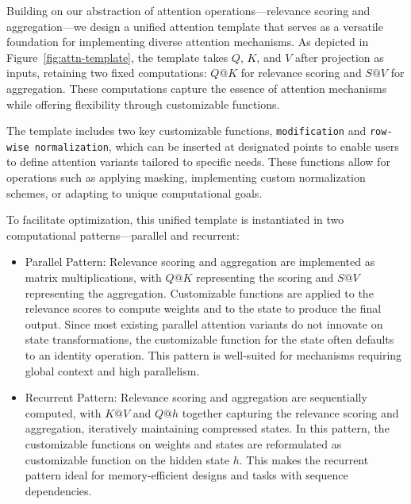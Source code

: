 



Building on our abstraction of attention operations—relevance scoring and aggregation—we design a unified attention template that serves as a versatile foundation for implementing diverse attention mechanisms. As depicted in Figure~\ref{fig:attn-template}, the template takes $Q$, $K$, and $V$ after projection as inputs, retaining two fixed computations: $Q@K$ for relevance scoring and $S@V$ for aggregation. These computations capture the essence of attention mechanisms while offering flexibility through customizable functions.

The template includes two key customizable functions, \texttt{modification} and \texttt{row-wise normalization}, which can be inserted at designated points to enable users to define attention variants tailored to specific needs. These functions allow for operations such as applying masking, implementing custom normalization schemes, or adapting to unique computational goals.

To facilitate optimization, this unified template is instantiated in two computational patterns—parallel and recurrent:
\begin{itemize}[noitemsep,topsep=0pt, left=0pt]
    \item Parallel Pattern: Relevance scoring and aggregation are implemented as matrix multiplications, with $Q@K$ representing the scoring and $S@V$ representing the aggregation. Customizable functions are applied to the relevance scores to compute weights and to the state to produce the final output. Since most existing parallel attention variants do not innovate on state transformations, the customizable function for the state often defaults to an identity operation. This pattern is well-suited for mechanisms requiring global context and high parallelism.
    \item Recurrent Pattern: Relevance scoring and aggregation are sequentially computed, with $K@V$ and $Q@h$ together capturing the relevance scoring and aggregation, iteratively maintaining compressed states. In this pattern, the customizable functions on weights and states are reformulated as customizable function on the hidden state $h$. This makes the recurrent pattern ideal for memory-efficient designs and tasks with sequence dependencies.
\end{itemize}

